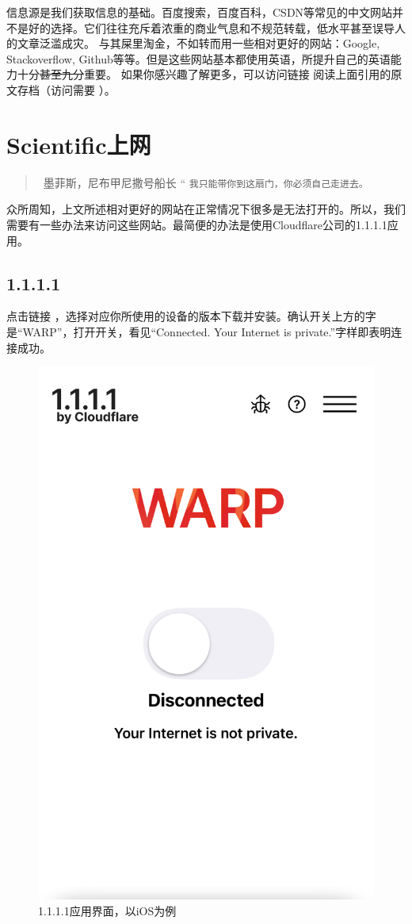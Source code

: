 \vspace{3cm}
信息源是我们获取信息的基础。百度搜索，百度百科，\textsf{CSDN}等常见的中文网站并不是好的选择。它们往往充斥着浓重的商业气息和不规范转载，低水平甚至误导人的文章泛滥成灾。
与其屎里淘金，不如转而用一些相对更好的网站：\textsf{Google}, \textsf{Stackoverflow}, \textsf{Github}等等。但是这些网站基本都使用英语，所提升自己的英语能力十分\sout{甚至九分}重要。
如果你感兴趣了解更多，可以访问链接 \href{https://web.archive.org/web/20220321083337/https://www.zhihu.com/question/49684783/answer/2305132342}{\color{black}\faLink} 
阅读上面引用的原文存档（访问需要 \hyperlink{warp}{}）。

\newpage
\section{Scientific上网}

\vspace{1cm}
\begin{quote}{\small \ 墨菲斯，尼布甲尼撒号船长\normalsize}
    \Huge{“}
    \normalsize \texttt{我只能带你到这扇门，你必须自己走进去。}
    \end{quote}
\vspace{1cm}

众所周知，上文所述相对更好的网站在正常情况下很多是无法打开的。所以，我们需要有一些办法来访问这些网站。最简便的办法是使用\textsf{Cloudflare}公司的\textsf{1.1.1.1}应用。
\hypertarget{warp}{\subsection{1.1.1.1}}
点击链接 \href{https://one.one.one.one}{\color{black}\faLink}，选择对应你所使用的设备的版本下载并安装。确认开关上方的字是“WARP”，打开开关，看见“Connected. Your Internet is private.”字样即表明连接成功。

\begin{figure}[h]
    \centering
    \includegraphics[width=0.4\columnwidth]{pics/warp.jpg}
    \caption{\textsf{1.1.1.1}应用界面，以\textsf{\textsf{iOS}}为例}
\end{figure}

